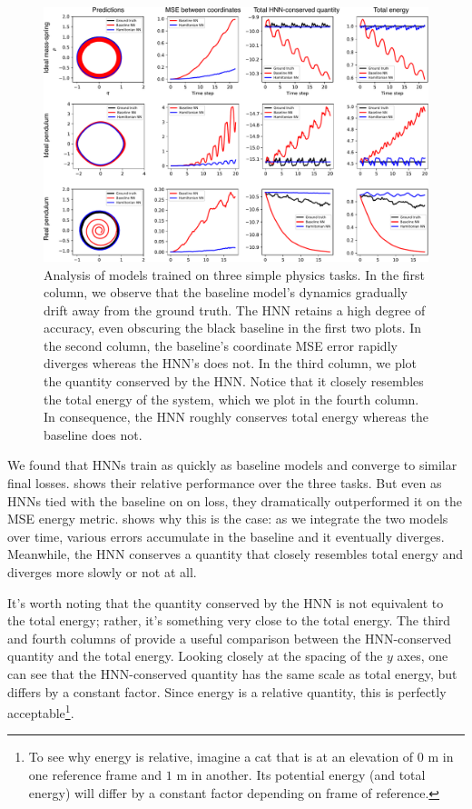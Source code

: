 \documentclass{article}
\begin{document}
\begin{figure}[h!]
\centering
\includegraphics[width=\textwidth]{static/simple-tasks}
\caption{
  Analysis of models trained on three simple physics tasks. In the first column, we observe that the baseline model's dynamics gradually drift away from the ground truth. The HNN retains a high degree of accuracy, even obscuring the black baseline in the first two plots. In the second column, the baseline's coordinate MSE error rapidly diverges whereas the HNN's does not. In the third column, we plot the quantity conserved by the HNN. Notice that it closely resembles the total energy of the system, which we plot in the fourth column. In consequence, the HNN roughly conserves total energy whereas the baseline does not.}
\end{figure}

We found that HNNs train as quickly as baseline models and converge to similar final losses.  shows their relative performance over the three tasks. But even as HNNs tied with the baseline on on loss, they dramatically outperformed it on the MSE energy metric.  shows why this is the case: as we integrate the two models over time, various errors accumulate in the baseline and it eventually diverges. Meanwhile, the HNN conserves a quantity that closely resembles total energy and diverges more slowly or not at all.

It's worth noting that the quantity conserved by the HNN is not equivalent to the total energy; rather, it's something very close to the total energy. The third and fourth columns of  provide a useful comparison between the HNN-conserved quantity and the total energy. Looking closely at the spacing of the $y$ axes, one can see that the HNN-conserved quantity has the same scale as total energy, but differs by a constant factor. Since energy is a relative quantity, this is perfectly acceptable\footnote{To see why energy is relative, imagine a cat that is at an elevation of $0$ m in one reference frame and $1$ m in another. Its potential energy (and total energy) will differ by a constant factor depending on frame of reference.}.
\end{document}
